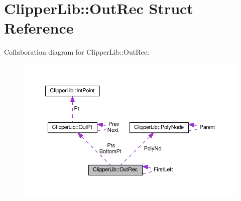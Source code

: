 \hypertarget{structClipperLib_1_1OutRec}{}\section{Clipper\+Lib\+:\+:Out\+Rec Struct Reference}
\label{structClipperLib_1_1OutRec}


Collaboration diagram for Clipper\+Lib\+:\+:Out\+Rec\+:
\nopagebreak
\begin{figure}[H]
\begin{center}
\leavevmode
\includegraphics[width=350pt]{structClipperLib_1_1OutRec__coll__graph}
\end{center}
\end{figure}
